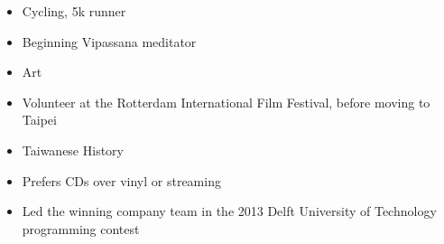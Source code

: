 





\begin{itemize}
	\item\small{Cycling, 5k runner}
	\item\small{Beginning Vipassana meditator}
	\item\small{Art}
	\item\small{Volunteer at the Rotterdam International Film Festival, before moving to Taipei}
	\item\small{Taiwanese History}
	\item\small{Prefers CDs over vinyl or streaming}
	\item\small{Led the winning company team in the 2013 Delft University of Technology programming contest}
\end{itemize}

%
